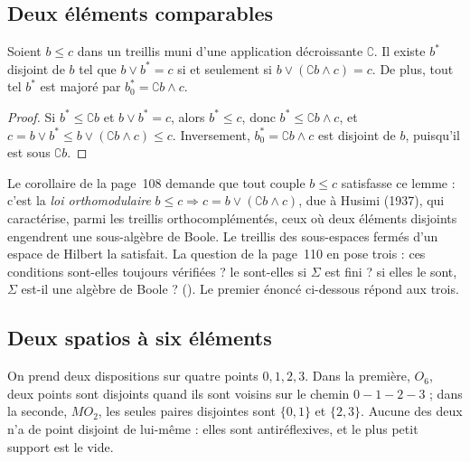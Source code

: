 \subsection*{Deux éléments comparables}

\begin{enonce}
Soient $b \leq c$ dans un treillis muni d'une application décroissante $\complement$. Il existe $b^{*}$ disjoint de $b$ tel que $b \vee b^{*} = c$ si et seulement si $b \vee (\complement b \wedge c) = c$. De plus, tout tel $b^{*}$ est majoré par $b^{*}_0 = \complement b \wedge c$.
\end{enonce}

\begin{proof}
Si $b^{*} \leq \complement b$ et $b \vee b^{*} = c$, alors $b^{*} \leq c$, donc $b^{*} \leq \complement b \wedge c$, et $c = b \vee b^{*} \leq b \vee (\complement b \wedge c) \leq c$. Inversement, $b^{*}_0 = \complement b \wedge c$ est disjoint de $b$, puisqu'il est sous $\complement b$.
\end{proof}

Le corollaire de la page~108 demande que tout couple $b \leq c$ satisfasse ce lemme : c'est la \emph{loi orthomodulaire} $b \leq c \Rightarrow c = b \vee (\complement b \wedge c)$, due à Husimi (1937), qui caractérise, parmi les treillis orthocomplémentés, ceux où deux éléments disjoints engendrent une sous-algèbre de Boole. Le treillis des sous-espaces fermés d'un espace de Hilbert la satisfait. La question de la page~110 en pose trois : ces conditions sont-elles toujours vérifiées ? le sont-elles si $\Sigma$ est fini ? si elles le sont, $\Sigma$ est-il une algèbre de Boole ? (). Le premier énoncé ci-dessous répond aux trois.

\subsection*{Deux spatios à six éléments}

On prend deux dispositions sur quatre points $0, 1, 2, 3$. Dans la première, $O_6$, deux points sont disjoints quand ils sont voisins sur le chemin $0 - 1 - 2 - 3$ ; dans la seconde, $MO_2$, les seules paires disjointes sont $\{0, 1\}$ et $\{2, 3\}$. Aucune des deux n'a de point disjoint de lui-même : elles sont antiréflexives, et le plus petit support est le vide.

